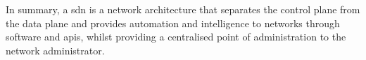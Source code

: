 In summary, a \gls{sdn} is a network architecture that separates the control plane from the data plane and provides automation and intelligence to networks through software and \gls{api}s, whilst providing a centralised point of administration to the network administrator.



